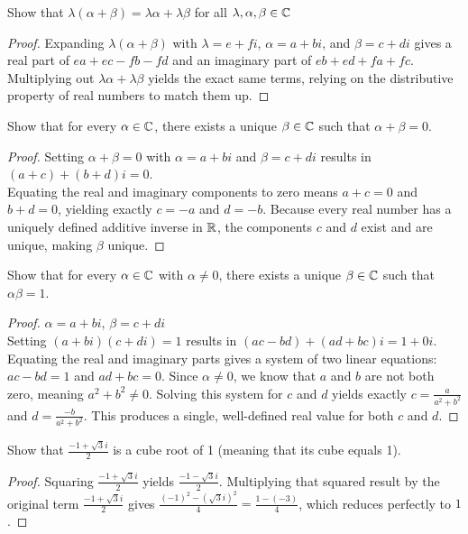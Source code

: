 \begin{question}
	Show that $\lambda(\alpha + \beta) = \lambda\alpha + \lambda\beta$ for all $\lambda, \alpha, \beta \in \mathbb{C}$
\end{question}
\begin{proof}
	Expanding $\lambda(\alpha + \beta)$ with $\lambda = e+fi$, $\alpha = a+bi$, and $\beta = c+di$ gives a real part of $ea + ec - fb - fd$ and an imaginary part of $eb + ed + fa + fc$. Multiplying out $\lambda\alpha + \lambda\beta$ yields the exact same terms, relying on the distributive property of real numbers to match them up.
\end{proof}
\begin{question}
	Show that for every $\alpha \in \mathbb{C}$, there exists a unique $\beta \in \mathbb{C}$ such that $\alpha + \beta = 0$. 
\end{question}
\begin{proof}
	Setting $\alpha + \beta = 0$ with $\alpha = a+bi$ and $\beta = c+di$ results in $(a+c) + (b+d)i = 0$.\\ Equating the real and imaginary components to zero means $a+c = 0$ and $b+d = 0$, yielding exactly $c = -a$ and $d = -b$. Because every real number has a uniquely defined additive inverse in $\mathbb{R}$, the components $c$ and $d$ exist and are unique, making $\beta$ unique.
\end{proof}
\begin{question}
	Show that for every $\alpha \in \mathbb{C}$ with $\alpha \neq 0$, there exists a unique $\beta \in \mathbb{C}$ such that $\alpha\beta = 1$.
\end{question}
\begin{proof}
	$\alpha = a+bi$, $\beta = c+di$\\
	Setting $(a+bi)(c+di) = 1$ results in $(ac - bd) + (ad + bc)i = 1 + 0i$. Equating the real and imaginary parts gives a system of two linear equations: $ac - bd = 1$ and $ad + bc = 0$. Since $\alpha \neq 0$, we know that $a$ and $b$ are not both zero, meaning $a^2 + b^2 \neq 0$. Solving this system for $c$ and $d$ yields exactly $c = \frac{a}{a^2+b^2}$ and $d = \frac{-b}{a^2+b^2}$. This produces a single, well-defined real value for both $c$ and $d$.
\end{proof}
\begin{question}
	Show that $\frac{-1 + \sqrt{3}i}{2}$ is a cube root of 1 (meaning that its cube equals 1).
\end{question}
\begin{proof}
	Squaring $\frac{-1 + \sqrt{3}i}{2}$ yields  $\frac{-1 - \sqrt{3}i}{2}$. Multiplying that squared result by the original term $\frac{-1 + \sqrt{3}i}{2}$ gives $\frac{(-1)^2 - (\sqrt{3}i)^2}{4} = \frac{1 - (-3)}{4}$, which reduces perfectly to $1$.
\end{proof}
